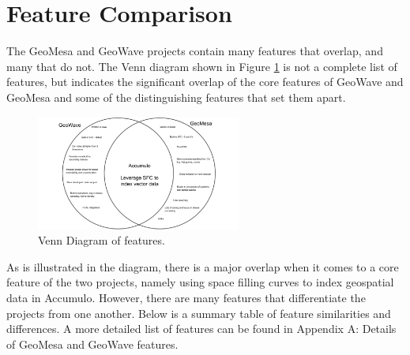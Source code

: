 \section{Feature Comparison}
\label{sec:featurecompare}

The GeoMesa and GeoWave projects contain many features that overlap, and many that do not.
The Venn diagram shown in Figure \ref{venn} is not a complete list of features,
but indicates the significant overlap of the core features of GeoWave and GeoMesa and some of the distinguishing features that set them apart.

\begin{figure}[h!tb]
  \centering
  \includegraphics[width=0.60\textwidth]{../docs/img/venn-diagram.png}
  \caption{Venn Diagram of features.}
  \label{venn}
\end{figure}

As is illustrated in the diagram, there is a major overlap when it comes to a core feature of the two projects, namely using space filling curves to index geospatial data in Accumulo.
However, there are many features that differentiate the projects from one another.
Below is a summary table of feature similarities and differences.
A more detailed list of features can be found in Appendix A: Details of GeoMesa and GeoWave features.





